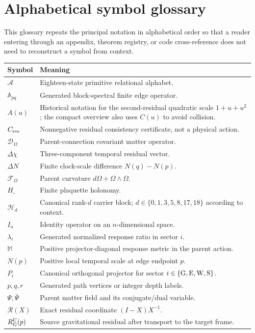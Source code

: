 \documentclass[11pt]{article}
\numberwithin{equation}{section}
\theoremstyle{remark}
\begin{document}
\clearpage
\section{Alphabetical symbol glossary}
\label{app:symbols}
This glossary repeats the principal notation in alphabetical order so that a reader entering through an appendix, theorem registry, or code cross-reference does not need to reconstruct a symbol from context.
\begin{longtable}{p{2.4cm}p{11.8cm}}
\toprule Symbol&Meaning\\\midrule\endhead
$\mathcal A$&Eighteen-state primitive relational alphabet.\\
$\mathbb A_{pq}$&Generated block-spectral finite edge operator.\\
$A(u)$&Historical notation for the second-residual quadratic scale $1+u+u^2$; the compact overview also uses $C(u)$ to avoid collision.\\
$C_{\rm res}$&Nonnegative residual consistency certificate, not a physical action.\\
$\mathcal D_{\Omega}$&Parent-connection covariant matter operator.\\
$\Delta\chi$&Three-component temporal residual vector.\\
$\Delta N$&Finite clock-scale difference $N(q)-N(p)$.\\
$\mathcal F_{\Omega}$&Parent curvature $d\Omega+\Omega\wedge\Omega$.\\
$H_{\square}$&Finite plaquette holonomy.\\
$\mathcal H_d$&Canonical rank-$d$ carrier block; $d\in\{0,1,3,5,8,17,18\}$ according to context.\\
$I_n$&Identity operator on an $n$-dimensional space.\\
$\lambda_i$&Generated normalized response ratio in sector $i$.\\
$\mathbb M$&Positive projector-diagonal response metric in the parent action.\\
$N(p)$&Positive local temporal scale at edge endpoint $p$.\\
$P_i$&Canonical orthogonal projector for sector $i\in\{{\rm G,E,W,S}\}$.\\
$p,q,r$&Generated path vertices or integer depth labels.\\
$\Psi,\bar\Psi$&Parent matter field and its conjugate/dual variable.\\
$\mathcal R(X)$&Exact residual coordinate $(I-X)X^{-1}$.\\
$R_{\rm G}^{U}(p)$&Source gravitational residual after transport to the target frame.\\

\end{longtable}
\end{document}
